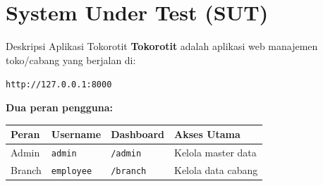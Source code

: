 \documentclass[aspectratio=169]{beamer}
\begin{document}
\section{System Under Test (SUT)}

\begin{frame}{Deskripsi Aplikasi Tokorotit}
  \textbf{Tokorotit} adalah aplikasi web manajemen toko/cabang yang berjalan di:
  \begin{center}
    \texttt{http://127.0.0.1:8000}
  \end{center}

  \vspace{0.5em}
  \textbf{Dua peran pengguna:}
  \begin{table}[h]
    \centering
    \begin{tabular}{llll}
      \toprule
      \textbf{Peran} & \textbf{Username} & \textbf{Dashboard} & \textbf{Akses Utama} \\
      \midrule
      Admin   & \texttt{admin}    & \texttt{/admin}  & Kelola master data \\
      Branch  & \texttt{employee} & \texttt{/branch} & Kelola data cabang \\
      \bottomrule
    \end{tabular}
  \end{table}
\end{frame}
\end{document}
